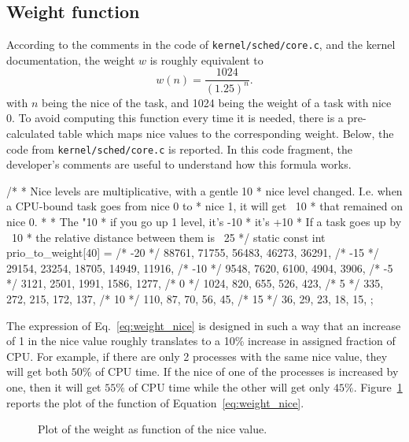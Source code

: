 \subsection{Weight function}
According to the comments in the code of \verb|kernel/sched/core.c|, and the kernel documentation, the weight $w$ is roughly equivalent to
\begin{equation}
  w(n) = \dfrac{1024}{(1.25)^{n}}.
  \label{eq:weight_nice}
\end{equation}
with $n$ being the nice of the task, and 1024 being the weight of a task with nice 0. To avoid computing this function every time it is needed, there is a pre-calculated table which maps nice
values to the corresponding weight. Below, the code from
\verb|kernel/sched/core.c| is reported. In this code fragment, the developer's comments are useful
to understand how this formula works.
\begin{code}
/*
 * Nice levels are multiplicative, with a gentle 10%
 * nice level changed. I.e. when a CPU-bound task goes from nice 0 to
 * nice 1, it will get ~10%
 * that remained on nice 0.
 *
 * The "10%
 * if you go up 1 level, it's -10%
 * it's +10%
 * If a task goes up by ~10%
 * the relative distance between them is ~25%
 */
static const int prio_to_weight[40] = {
/* -20 */ 88761, 71755, 56483, 46273, 36291,
/* -15 */ 29154, 23254, 18705, 14949, 11916,
/* -10 */ 9548, 7620, 6100, 4904, 3906,
/* -5 */ 3121, 2501, 1991, 1586, 1277,
/* 0 */ 1024, 820, 655, 526, 423,
/* 5 */ 335, 272, 215, 172, 137,
/* 10 */ 110, 87, 70, 56, 45,
/* 15 */ 36, 29, 23, 18, 15,
};
\end{code}
The expression of Eq.~\eqref{eq:weight_nice} is designed in such a way that an increase of 1 in the nice value roughly translates to a 10\% increase in assigned fraction of CPU.
For example, if there are only 2 processes with the same nice value, they will get both $50\%$ of CPU time. If the nice of one of the processes is increased by one, then it will get $55\%$ of CPU time while the other will get only $45\%$.
Figure~\ref{fig:weight_vs_nice} reports the plot of the function of Equation~\eqref{eq:weight_nice}.
\begin{figure}[htb]
\label{fig:weight_vs_nice}
\caption{Plot of the weight as function of the nice value.}
\end{figure}
